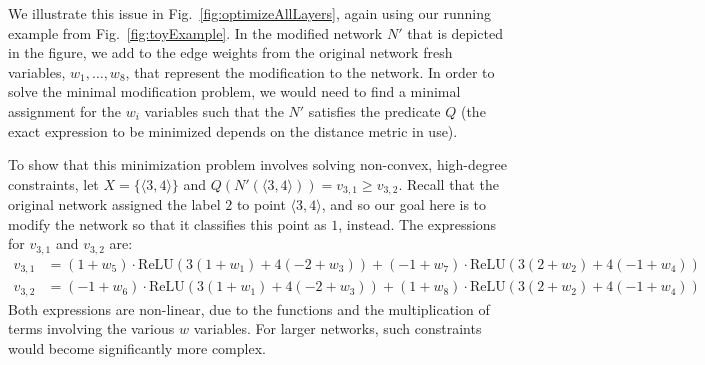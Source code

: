 \documentclass{easychair}
\newcommand{\relu}{\text{ReLU}\xspace{}}
\begin{document}
We illustrate this issue in Fig.~\ref{fig:optimizeAllLayers}, again using
our running example from Fig.~\ref{fig:toyExample}. In the modified network
$N'$ that is depicted in the figure, we add to the edge weights from
the original network fresh variables, 
$w_1,\ldots,w_8$, that represent the modification to the network. In
order to solve the minimal modification problem, we would
need to find a minimal assignment for the $w_i$ variables
such that the $N'$ satisfies the predicate $Q$
(the exact expression to be minimized
depends on the distance metric in use).

To show that this minimization problem 
involves solving non-convex, high-degree constraints, let 
 $X=\{\langle 3, 4\rangle\}$ and $Q(N'(\langle
3,4\rangle))=v_{3,1}\geq v_{3,2}$. Recall that the original network
assigned the label $2$ to point $\langle 3,4\rangle$, and so our goal here is to
modify the network so that it classifies this point as $1$, instead.
The expressions for $v_{3,1}$ and $v_{3,2}$ are:
\begin{align*}
  v_{3,1}&=
  (1+w_5)\cdot  \relu{}(3(1+w_1)+4(-2+w_3))
  +
  (-1+w_7)\cdot \relu{}(3(2+w_2)+4(-1+w_4))
  \\
  v_{3,2}&=
  (-1+w_6)\cdot \relu{}(3(1+w_1)+4(-2+w_3))
  +
  (1+w_8) \cdot \relu{}(3(2+w_2)+4(-1+w_4))
\end{align*}
Both expressions are non-linear, due to the \relu{} functions and the
multiplication of terms involving the various $w$ variables.
For larger networks, such constraints would become significantly more complex.
\end{document}
